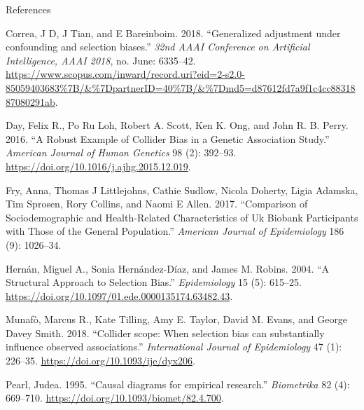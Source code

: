 \documentclass[
  ignorenonframetext,
]{beamer}
\begin{document}
\begin{frame}[allowframebreaks]{References}
\protect\hypertarget{references}{}

\small

\hypertarget{refs}{}
\leavevmode\hypertarget{ref-Correa2018}{}%
Correa, J D, J Tian, and E Bareinboim. 2018. ``Generalized adjustment
under confounding and selection biases.'' \emph{32nd AAAI Conference on
Artificial Intelligence, AAAI 2018}, no. June: 6335--42.
\url{https://www.scopus.com/inward/record.uri?eid=2-s2.0-85059403683\%7B/\&\%7DpartnerID=40\%7B/\&\%7Dmd5=d87612fd7a9f1c4cc8831887080291ab}.

\leavevmode\hypertarget{ref-Day2016}{}%
Day, Felix R., Po Ru Loh, Robert A. Scott, Ken K. Ong, and John R. B.
Perry. 2016. ``A Robust Example of Collider Bias in a Genetic
Association Study.'' \emph{American Journal of Human Genetics} 98 (2):
392--93. \url{https://doi.org/10.1016/j.ajhg.2015.12.019}.

\leavevmode\hypertarget{ref-fry2017comparison}{}%
Fry, Anna, Thomas J Littlejohns, Cathie Sudlow, Nicola Doherty, Ligia
Adamska, Tim Sprosen, Rory Collins, and Naomi E Allen. 2017.
``Comparison of Sociodemographic and Health-Related Characteristics of
Uk Biobank Participants with Those of the General Population.''
\emph{American Journal of Epidemiology} 186 (9): 1026--34.

\leavevmode\hypertarget{ref-Hernan2004}{}%
Hernán, Miguel A., Sonia Hernández-Díaz, and James M. Robins. 2004. ``A
Structural Approach to Selection Bias.'' \emph{Epidemiology} 15 (5):
615--25. \url{https://doi.org/10.1097/01.ede.0000135174.63482.43}.

\leavevmode\hypertarget{ref-Munafo2018}{}%
Munafò, Marcus R., Kate Tilling, Amy E. Taylor, David M. Evans, and
George Davey Smith. 2018. ``Collider scope: When selection bias can
substantially influence observed associations.'' \emph{International
Journal of Epidemiology} 47 (1): 226--35.
\url{https://doi.org/10.1093/ije/dyx206}.

\leavevmode\hypertarget{ref-Pearl1995}{}%
Pearl, Judea. 1995. ``Causal diagrams for empirical research.''
\emph{Biometrika} 82 (4): 669--710.
\url{https://doi.org/10.1093/biomet/82.4.700}.

\end{frame}
\end{document}
